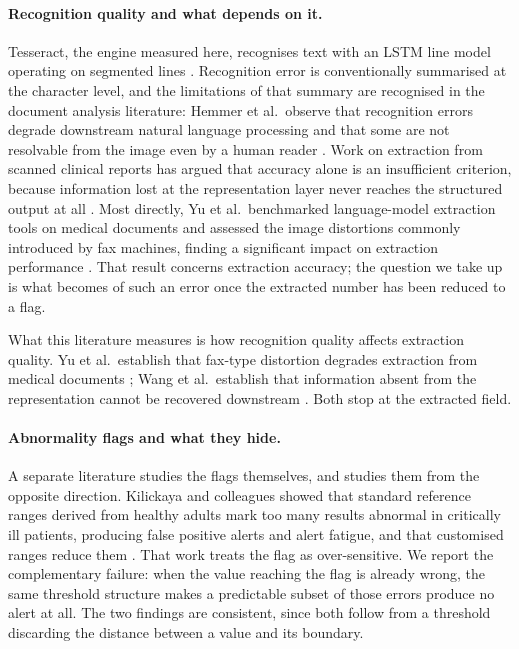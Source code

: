 \documentclass[11pt]{article}
\begin{document}
\paragraph{Recognition quality and what depends on it.}
Tesseract, the engine measured here, recognises text with an LSTM line model operating on
segmented lines \citep{smith2007tesseract}. Recognition error is conventionally summarised at
the character level, and the limitations of that summary are recognised in the document analysis
literature: Hemmer et al.\ observe that recognition errors degrade downstream natural language
processing and that some are not resolvable from the image even by a human reader
\citep{hemmer2024confidence}. Work on extraction from scanned clinical reports has argued that
accuracy alone is an insufficient criterion, because information lost at the representation
layer never reaches the structured output at all \citep{wang2026keycoverage}. Most directly, Yu et al.\ benchmarked
language-model extraction tools on medical documents and assessed the image distortions
commonly introduced by fax machines, finding a significant impact on extraction performance
\citep{yu2026benchmark}. That result concerns extraction accuracy; the question we take up is
what becomes of such an error once the extracted number has been reduced to a flag.

What this literature measures is how recognition quality affects extraction quality. Yu et al.\
establish that fax-type distortion degrades extraction from medical documents
\citep{yu2026benchmark}; Wang et al.\ establish that information absent from the representation
cannot be recovered downstream \citep{wang2026keycoverage}. Both stop at the extracted field.

\paragraph{Abnormality flags and what they hide.}
A separate literature studies the flags themselves, and studies them from the opposite
direction. Kilickaya and colleagues showed that standard reference ranges derived from healthy
adults mark too many results abnormal in critically ill patients, producing false positive
alerts and alert fatigue, and that customised ranges reduce them \citep{kilickaya2014ranges}.
That work treats the flag as over-sensitive. We report the complementary failure: when the
value reaching the flag is already wrong, the same threshold structure makes a predictable
subset of those errors produce no alert at all. The two findings are consistent, since both
follow from a threshold discarding the distance between a value and its boundary.
\end{document}
